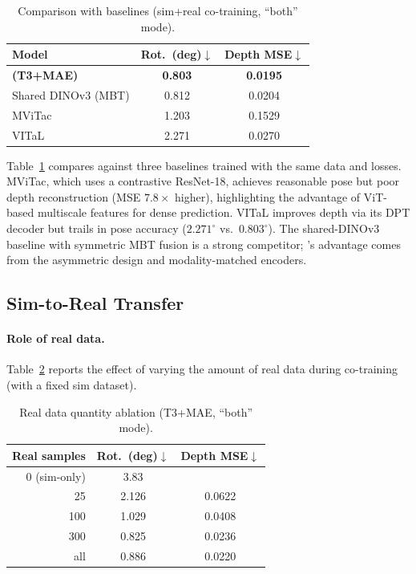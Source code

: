 \begin{table}[t]
\caption{Comparison with baselines (sim+real co-training, ``both'' mode).}
\label{tab:baselines}
\begin{center}
\begin{tabular}{lcc}
\toprule
Model & Rot.\ (deg)$\downarrow$ & Depth MSE$\downarrow$ \\
\midrule
\textbf{\method{} (T3+MAE)} & \textbf{0.803} & \textbf{0.0195} \\
Shared DINOv3 (MBT)         & 0.812          & 0.0204 \\
MViTac~\cite{fu2024mvitac}  & 1.203          & 0.1529 \\
VITaL                       & 2.271          & 0.0270 \\
\bottomrule
\end{tabular}
\end{center}
\end{table}

Table~\ref{tab:baselines} compares \method{} against three baselines trained
with the same data and losses. MViTac, which uses a contrastive ResNet-18,
achieves reasonable pose but poor depth reconstruction (MSE $7.8{\times}$
higher), highlighting the advantage of ViT-based multiscale features for
dense prediction. VITaL improves depth via its DPT decoder but trails in pose
accuracy ($2.271^{\circ}$ vs.\ $0.803^{\circ}$). The shared-DINOv3 baseline
with symmetric MBT fusion is a strong competitor; \method{}'s advantage comes
from the asymmetric design and modality-matched encoders.

\subsection{Sim-to-Real Transfer}
\label{sec:sim2real}

\paragraph{Role of real data.}
Table~\ref{tab:real_ratio} reports the effect of varying the amount of real
data during co-training (with a fixed sim dataset).

\begin{table}[t]
\caption{Real data quantity ablation (T3+MAE, ``both'' mode).}
\label{tab:real_ratio}
\begin{center}
\begin{tabular}{rcc}
\toprule
Real samples & Rot.\ (deg)$\downarrow$ & Depth MSE$\downarrow$ \\
\midrule
0 (sim-only)    & 3.83  & \todo{--}  \\
25              & 2.126 & 0.0622 \\
100             & 1.029 & 0.0408 \\
300             & 0.825 & 0.0236 \\
all             & 0.886 & 0.0220 \\
\bottomrule
\end{tabular}
\end{center}
\end{table}

